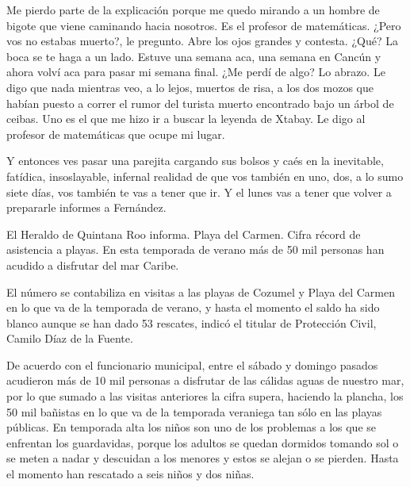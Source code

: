 \documentclass[12pt,twoside,openright,a5paper]{book}
\begin{document}
Me pierdo parte de la explicación porque me quedo mirando a un
hombre de bigote que viene caminando hacia nosotros. Es el profesor de
matemáticas. ¿Pero vos no estabas muerto?, le pregunto. Abre los ojos
grandes y contesta. ¿Qué? La boca se te haga a un lado. Estuve una semana
aca, una semana en Cancún y ahora volví aca para pasar mi semana final. ¿Me
perdí de algo? Lo abrazo. Le digo que nada mientras veo, a lo lejos, muertos de risa,
a los dos mozos que habían puesto a correr el rumor del turista muerto
encontrado bajo un árbol de ceibas. Uno es el que me hizo ir a buscar la
leyenda de Xtabay. Le digo al profesor de matemáticas que ocupe mi lugar.


\vspace{0.5cm}
\hrulefill\hspace{0.2cm} \decofourleft\decofourright \hspace{0.2cm} \hrulefill
\vspace{0.5cm}

Y entonces ves pasar una parejita cargando sus bolsos y caés en la
inevitable, fatídica, insoslayable, infernal realidad de que vos también en
uno, dos, a lo sumo siete días, vos también te vas a tener que ir. Y
el lunes vas a tener que volver a prepararle informes a Fernández.


\vspace{0.5cm}
\hrulefill\hspace{0.2cm} \decofourleft\decofourright \hspace{0.2cm} \hrulefill
\vspace{0.5cm}

El Heraldo de Quintana Roo informa. Playa del Carmen. Cifra récord de
asistencia a playas. En esta temporada de verano más de 50 mil personas
han acudido a disfrutar del mar Caribe.

El número se contabiliza en visitas a las playas de Cozumel y Playa
del Carmen en lo que va de la temporada de verano, y hasta el momento el
saldo ha sido blanco aunque se han dado 53 rescates, indicó el titular de
Protección Civil, Camilo Díaz de la Fuente.

De acuerdo con el funcionario municipal, entre el sábado y domingo pasados
acudieron más de 10 mil personas a disfrutar de las cálidas aguas de
nuestro mar, por lo que sumado a las visitas anteriores la cifra supera,
haciendo la plancha, los 50 mil bañistas en lo que va de la temporada
veraniega tan sólo en las playas públicas.  En temporada alta los niños
son uno de los problemas a los que se enfrentan los guardavidas, porque
los adultos se quedan dormidos tomando sol o se meten a nadar y descuidan a
los menores y estos se alejan o se pierden. Hasta el momento han rescatado
a seis niños y dos niñas.
\end{document}
